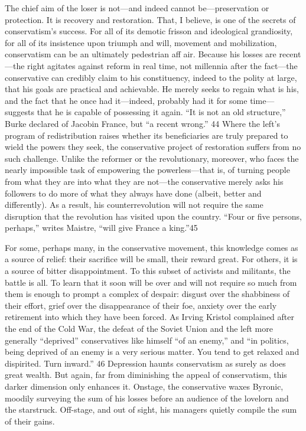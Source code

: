  \par 
The chief aim of the loser is not—and indeed cannot be—preservation or protection. It is recovery and restoration. That, I believe, is one of the secrets of conservatism’s success. For all of its demotic frisson and ideological grandiosity, for all of its insistence upon triumph and will, movement and mobilization, conservatism can be an ultimately pedestrian aff air. Because his losses are recent—the right agitates against reform in real time, not millennia after the fact—the conservative can credibly claim to his constituency, indeed to the polity at large, that his goals are practical and achievable. He merely seeks to regain what is his, and the fact that he once had it—indeed, probably had it for some time— suggests that he is capable of possessing it again. “It is not an old structure,” Burke declared of Jacobin France, but “a recent wrong.” {\color{blue}44} Where the left’s program of redistribution raises whether its beneficiaries are truly prepared to wield the powers they seek, the conservative project of restoration suffers from no such challenge. Unlike the reformer or the revolutionary, moreover, who faces the nearly impossible task of empowering the powerless—that is, of turning people from what they are into what they are not—the conservative merely asks his followers to do more of what they always have done (albeit, better and differently). As a result, his counterrevolution will not require the same disruption that the revolution has visited upon the country. “Four or five persons, perhaps,” writes Maistre, “will give France a king.”{\color{blue}45}
 \par 
For some, perhaps many, in the conservative movement, this knowledge comes as a source of relief: their sacrifice will be small, their reward great. For others, it is a source of bitter disappointment. To this subset of activists and militants, the battle is all. To learn that it soon will be over and will not require so much from them is enough to prompt a complex of despair: disgust over the shabbiness of their effort, grief over the disappearance of their foe, anxiety over the early retirement into which they have been forced. As Irving Kristol complained after the end of the Cold War, the defeat of the Soviet Union and the left more generally “deprived” conservatives like himself “of an enemy,” and “in politics, being deprived of an enemy is a very serious matter. You tend to get relaxed and dispirited. Turn inward.” {\color{blue}46} Depression haunts conservatism as surely as does great wealth. But again, far from diminishing the appeal of conservatism, this darker dimension only enhances it. Onstage, the conservative waxes Byronic, moodily surveying the sum of his losses before an audience of the lovelorn and the starstruck. Off-stage, and out of sight, his managers quietly compile the sum of their gains.

